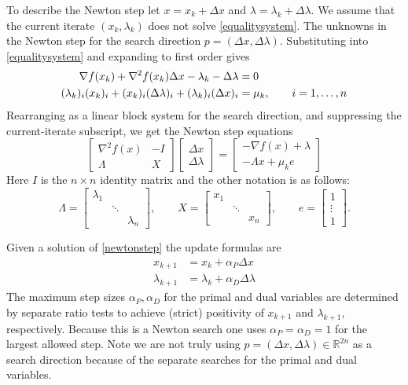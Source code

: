 \documentclass[11pt]{article}
\newcommand{\RR}{\mathbb{R}}
\newcommand{\grad}{\nabla}
\begin{document}
To describe the Newton step let $x=x_k+\Delta x$ and $\lambda=\lambda_k+\Delta\lambda$.  We assume that the current iterate $(x_k,\lambda_k)$ does not solve \eqref{equalitysystem}.  The unknowns in the Newton step for the search direction $p=(\Delta x,\Delta \lambda)$.  Substituting into \eqref{equalitysystem} and expanding to first order gives
\begin{align}
\grad f(x_k) + \grad^2 f(x_k) \Delta x - \lambda_k - \Delta \lambda &= 0 \label{prenewtonstep} \\
(\lambda_k)_i (x_k)_i + (x_k)_i (\Delta\lambda)_i + (\lambda_k)_i (\Delta x)_i &= \mu_k, \qquad i=1,\dots,n \notag
\end{align}
Rearranging as a linear block system for the search direction, and suppressing the current-iterate subscript, we get the Newton step equations
\begin{equation}
\begin{bmatrix}
\grad^2 f(x) & - I \\
\Lambda & X
\end{bmatrix}
\begin{bmatrix}
\Delta x \\
\Delta \lambda
\end{bmatrix}
=
\begin{bmatrix}
-\grad f(x) + \lambda \\
-\Lambda x + \mu_k e
\end{bmatrix}
 \label{newtonstep}
\end{equation}
Here $I$ is the $n\times n$ identity matrix and the other notation is as follows:
    $$\Lambda = \begin{bmatrix} \lambda_1 & & \\ & \ddots & \\ & & \lambda_n \end{bmatrix}, \qquad X = \begin{bmatrix} x_1 & & \\ & \ddots & \\ & & x_n \end{bmatrix}, \qquad e = \begin{bmatrix} 1 \\ \vdots \\ 1 \end{bmatrix}.$$

Given a solution of \eqref{newtonstep} the update formulas are
\begin{align*}
x_{k+1} &= x_k + \alpha_P \Delta x \\
\lambda_{k+1} &= \lambda_k + \alpha_D \Delta \lambda
\end{align*}
The maximum step sizes $\alpha_P,\alpha_D$ for the primal and dual variables are determined by separate ratio tests to achieve (strict) positivity of $x_{k+1}$ and $\lambda_{k+1}$, respectively.  Because this is a Newton search one uses $\alpha_P=\alpha_D=1$ for the largest allowed step.  Note we are not truly using $p=(\Delta x,\Delta \lambda) \in \RR^{2n}$ as a search direction because of the separate searches for the primal and dual variables.
\end{document}
